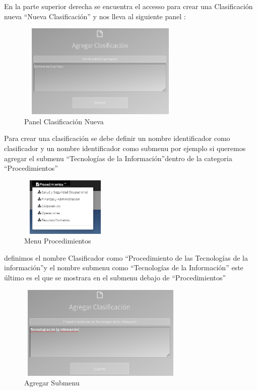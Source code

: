 \documentclass[12pt,letterpaper]{article}
\begin{document}
{\begin{subsection}{\color{blackgreen}}
       En la parte superior derecha se encuentra el accesso para crear una Clasificaci\'on nueva \textquotedblleft Nueva Clasificaci\'on\textquotedblright
       y nos lleva al siguiente panel :
      \newpage
               \begin{figure}[htb]
                 \centering
                 \includegraphics[angle=0,width=80mm,height=45mm]{img/Selection_038.png}
                 \caption{Panel Clasificación Nueva}
                 \label{class}
               \end{figure}

       Para crear una clasificaci\'on se debe definir un nombre identificador como clasificador y un nombre identificador como submenu
       por ejemplo si queremos agregar el submenu \textquotedblleft{Tecnolog\'ias de la Informaci\'on}\textquotedblright dentro de la categoria  \textquotedblleft{Procedimientos}\textquotedblright
               \begin{figure}[htb]
                 \centering
                 \includegraphics[angle=0,width=43mm,height=28mm]{img/Menu_041.png}
                 \caption{Menu Procedimientos}
                 \label{add_subMenu}
               \end{figure}
       definimos el nombre Clasificador como \textquotedblleft{Procedimiento de las Tecnolog\'ias de la informaci\'on}\textquotedblright y el nombre submenu como \textquotedblleft{Tecnolog\'ias de la Informaci\'on}\textquotedblright
       este \'ultimo es el que se mostrara en el submenu debajo de \textquotedblleft{Procedimientos}\textquotedblright

              \begin{figure}[htb]
                \centering
                \includegraphics[angle=0,width=80mm,height=45mm]{img/Selection_042.png}
                \caption{Agregar Submenu}
                \label{add_submenu}
              \end{figure}


\end{subsection}}
\end{document}

